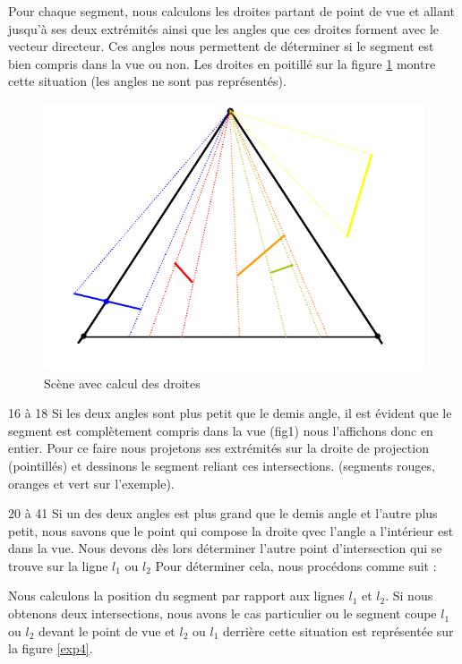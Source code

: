 \documentclass[11pt,a4paper]{article}
\begin{document}
Pour chaque segment, nous calculons les droites partant de point de vue et allant jusqu'à ses deux extrémités ainsi que les angles que ces droites forment avec le vecteur directeur. Ces angles nous permettent de déterminer si le segment est bien compris dans la vue ou non. Les droites en poitillé sur la figure \ref{exp_3} montre cette situation (les angles ne sont pas représentés).

\begin{figure}[!h]
\centering
\includegraphics[scale=0.6]{inter.png}
\caption{Scène avec calcul des droites}
\label{exp_3}
\end{figure}

16 à 18 
Si les deux angles sont plus petit que le demis angle, il est évident que le segment est complètement compris dans la vue (fig1) nous l'affichons donc en entier. Pour ce faire nous projetons ses extrémités sur la droite de projection (pointillés) et dessinons le segment reliant ces intersections. (segments rouges, oranges et vert sur l'exemple).

20 à 41
Si un des deux angles est plus grand que le demis angle et l'autre plus petit, nous savons que le point qui compose la droite qvec l'angle a l'intérieur est dans la vue. Nous devons dès lors déterminer l'autre point d'intersection qui se trouve sur la ligne $l_1$ ou 
$l_2$ Pour déterminer cela, nous procédons comme suit :

Nous calculons la position du segment par rapport aux lignes $l_1$ et $l_2$. Si nous obtenons deux intersections, nous avons le cas particulier ou le segment coupe $l_1$ ou $l_2$ devant le point de vue et $l_2$ ou $l_1$ derrière cette situation est représentée sur la figure \ref{exp4}. 
\end{document}
